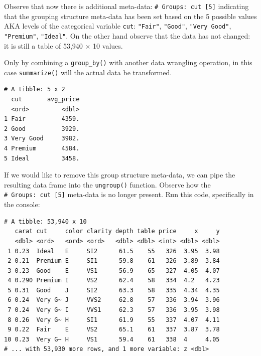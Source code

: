 \documentclass[12pt, krantz2,]{krantz}
\makeatletter
\newenvironment{Shaded}{\begin{snugshade}}{\end{snugshade}}
\newcommand{\DataTypeTok}[1]{\textcolor[rgb]{0.27,0.27,0.27}{#1}}
\newcommand{\KeywordTok}[1]{\textcolor[rgb]{0.27,0.27,0.27}{\textbf{#1}}}
\newcommand{\NormalTok}[1]{#1}
\newcommand{\OperatorTok}[1]{\textcolor[rgb]{0.43,0.43,0.43}{\textbf{#1}}}
\newcommand{\StringTok}[1]{\textcolor[rgb]{0.5,0.5,0.5}{#1}}
\newenvironment{kframe}{%
\medskip{}
\setlength{\fboxsep}{.8em}
 \def\at@end@of@kframe{}%
 \ifinner\ifhmode%
  \def\at@end@of@kframe{\end{minipage}}%
  \begin{minipage}{\columnwidth}%
 \fi\fi%
 \def\FrameCommand##1{\hskip\@totalleftmargin \hskip-\fboxsep
 \colorbox{shadecolor}{##1}\hskip-\fboxsep
     \hskip-\linewidth \hskip-\@totalleftmargin \hskip\columnwidth}%
 \MakeFramed {\advance\hsize-\width
   \@totalleftmargin\z@ \linewidth\hsize
   \@setminipage}}%
 {\par\unskip\endMakeFramed%
 \at@end@of@kframe}
\renewenvironment{Shaded}{\begin{kframe}}{\end{kframe}}
\makeatother
\begin{document}
Observe that now there is additional meta-data: \texttt{\#\ Groups:\ cut\ {[}5{]}} indicating that the grouping structure meta-data has been set based on the 5 possible values AKA levels of the categorical variable \texttt{cut}: \texttt{"Fair"}, \texttt{"Good"}, \texttt{"Very\ Good"}, \texttt{"Premium"}, \texttt{"Ideal"}. On the other hand observe that the data has not changed: it is still a table of 53,940 \(\times\) 10 values.

Only by combining a \texttt{group\_by()} with another data wrangling operation, in this case \texttt{summarize()} will the actual data be transformed.

\begin{Shaded}
\end{Shaded}

\begin{verbatim}
# A tibble: 5 x 2
  cut       avg_price
  <ord>         <dbl>
1 Fair          4359.
2 Good          3929.
3 Very Good     3982.
4 Premium       4584.
5 Ideal         3458.
\end{verbatim}

If we would like to remove this group structure meta-data, we can pipe the resulting data frame into the \texttt{ungroup()} function. Observe how the \texttt{\#\ Groups:\ cut\ {[}5{]}} meta-data is no longer present. Run this code, specifically in the console:

\begin{Shaded}
\end{Shaded}

\begin{verbatim}
# A tibble: 53,940 x 10
   carat cut     color clarity depth table price     x     y
   <dbl> <ord>   <ord> <ord>   <dbl> <dbl> <int> <dbl> <dbl>
 1 0.23  Ideal   E     SI2      61.5    55   326  3.95  3.98
 2 0.21  Premium E     SI1      59.8    61   326  3.89  3.84
 3 0.23  Good    E     VS1      56.9    65   327  4.05  4.07
 4 0.290 Premium I     VS2      62.4    58   334  4.2   4.23
 5 0.31  Good    J     SI2      63.3    58   335  4.34  4.35
 6 0.24  Very G~ J     VVS2     62.8    57   336  3.94  3.96
 7 0.24  Very G~ I     VVS1     62.3    57   336  3.95  3.98
 8 0.26  Very G~ H     SI1      61.9    55   337  4.07  4.11
 9 0.22  Fair    E     VS2      65.1    61   337  3.87  3.78
10 0.23  Very G~ H     VS1      59.4    61   338  4     4.05
# ... with 53,930 more rows, and 1 more variable: z <dbl>
\end{verbatim}
\end{document}
